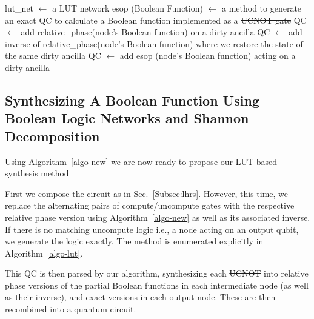 \documentclass[paper]{ieice}
\providecommand{\DIFadd}[1]{{\protect\color{blue}{#1}}} %
\providecommand{\DIFdel}[1]{{\protect\color{red}\sout{#1}}}                      %
\providecommand{\DIFaddbegin}{} %
\providecommand{\DIFaddend}{} %
\providecommand{\DIFdelbegin}{} %
\providecommand{\DIFdelend}{} %
\newcommand{\DIFscaledelfig}{0.5}
\newlength{\DIFdelgraphicswidth} %
\newlength{\DIFdelgraphicsheight} %
\newcommand{\DIFaddincludegraphics}[2][]{{\color{blue}\fbox{\DIFOincludegraphics[#1]{#2}}}} %
\newcommand{\DIFdelincludegraphics}[2][]{%
\sbox{\DIFdelgraphicsbox}{\DIFOincludegraphics[#1]{#2}}%
\settoboxwidth{\DIFdelgraphicswidth}{\DIFdelgraphicsbox} %
\settoboxtotalheight{\DIFdelgraphicsheight}{\DIFdelgraphicsbox} %
\scalebox{\DIFscaledelfig}{%
\parbox[b]{\DIFdelgraphicswidth}{\usebox{\DIFdelgraphicsbox}\\[-\baselineskip] \rule{\DIFdelgraphicswidth}{0em}}\llap{\resizebox{\DIFdelgraphicswidth}{\DIFdelgraphicsheight}{%
\setlength{\unitlength}{\DIFdelgraphicswidth}%
\begin{picture}(1,1)%
\thicklines\linethickness{2pt} %
{\color[rgb]{1,0,0}\put(0,0){\framebox(1,1){}}}%
{\color[rgb]{1,0,0}\put(0,0){\line( 1,1){1}}}%
{\color[rgb]{1,0,0}\put(0,1){\line(1,-1){1}}}%
\end{picture}%
}\hspace*{3pt}}} %
} %
\DeclareRobustCommand{\DIFaddbegin}{\DIFOaddbegin \let\includegraphics\DIFaddincludegraphics} %
\DeclareRobustCommand{\DIFaddend}{\DIFOaddend \let\includegraphics\DIFOincludegraphics} %
\DeclareRobustCommand{\DIFdelbegin}{\DIFOdelbegin \let\includegraphics\DIFdelincludegraphics} %
\DeclareRobustCommand{\DIFdelend}{\DIFOaddend \let\includegraphics\DIFOincludegraphics} %
\begin{document}
\begin{algorithm}[tb]
  \caption{lut\_synthesis}
  \label{algo-lut}
  \begin{algorithmic}
    \State lut\_net $\leftarrow$ a LUT network
    \State esop (Boolean Function) $\leftarrow$ a method to generate
    an exact QC to calculate a Boolean function implemented as a \DIFdelbegin \DIFdel{UCNOT gate 
    }%
\DIFdelend \DIFaddbegin \DIFadd{FCNOT gate 
    }\State \DIFadd{node\_traversal $\leftarrow$ a method to traverse lut\_net
    }\While {\DIFadd{node\_traversal returns a valid node}}
    \DIFaddend {}
    \State QC $\leftarrow$ add relative\_phase(node's Boolean function) \DIFaddbegin \DIFadd{acting }\DIFaddend on a dirty ancilla
    \State QC $\leftarrow$ add inverse of relative\_phase(node's 
    Boolean function) where we restore the state of the same dirty ancilla
    \State QC $\leftarrow$ add esop (node's Boolean function) acting on a dirty ancilla
    \EndIf
    \DIFdelbegin %
\DIFdelend \DIFaddbegin \EndWhile
  \DIFaddend \end{algorithmic}
\end{algorithm}

\subsection{Synthesizing A Boolean Function Using Boolean Logic Networks and Shannon Decomposition }

Using Algorithm~\ref{algo-new} we are now ready to propose our LUT-based synthesis method 

First we compose the circuit as in Sec.~\ref{Subsec:lhrs}. However, this time, we replace the alternating pairs of compute/uncompute gates with the respective relative phase version using Algorithm~\ref{algo-new} as well as its associated inverse. If there is no matching uncompute logic i.e., a node acting on an output qubit, we generate the logic exactly. The method is enumerated explicitly in Algorithm~\ref{algo-lut}.

This QC is then parsed by our algorithm, synthesizing each \DIFdelbegin \DIFdel{UCNOT }\DIFdelend \DIFaddbegin \DIFadd{FCNOT }\DIFaddend into relative phase versions of the partial Boolean functions in each intermediate node (as well as their inverse), and exact versions in each output node. These are then recombined into a quantum circuit. 
\end{document}
